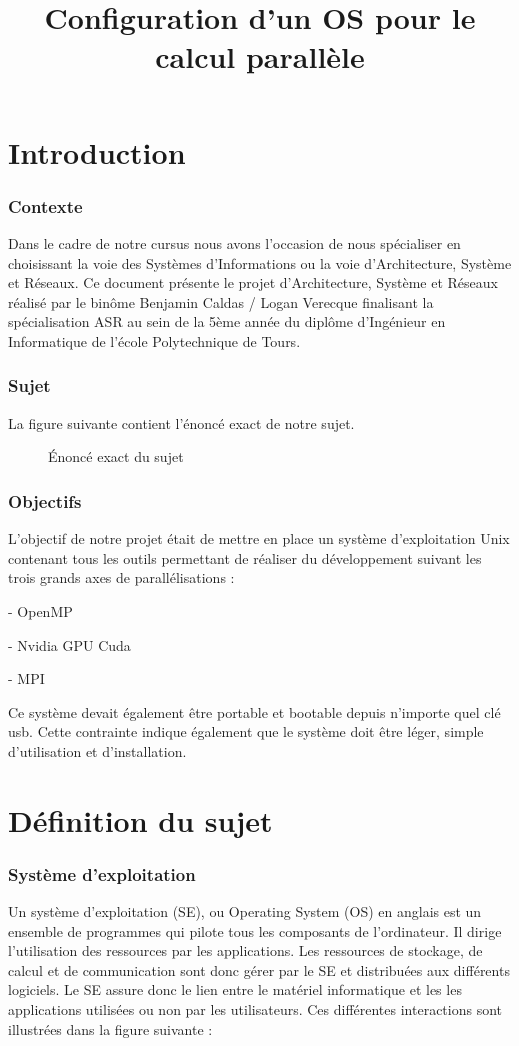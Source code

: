 \documentclass[final]{polytech/polytech}
\title{Configuration d’un OS pour le calcul parallèle}
\begin{document}
\part{Introduction}

\section{Contexte}
Dans le cadre de notre cursus nous avons l’occasion de nous spécialiser en choisissant la voie des Systèmes d’Informations ou la voie d’Architecture, Système et Réseaux. Ce document présente le projet d’Architecture, Système et Réseaux réalisé par le binôme Benjamin Caldas / Logan Verecque finalisant la spécialisation ASR au sein de la 5ème année du diplôme d’Ingénieur en Informatique de l’école Polytechnique de Tours.

\section{Sujet}
La figure suivante contient l'énoncé exact de notre sujet.

\begin{figure}
	\caption{Énoncé exact du sujet}
	\label{fig:enonce_sujet_projet_asr}
\end{figure}

\section{Objectifs}
L’objectif de notre projet était de mettre en place un système d’exploitation Unix contenant tous les outils permettant de réaliser du développement suivant les trois grands axes de parallélisations :

- OpenMP

- Nvidia GPU Cuda

- MPI

Ce système devait également être portable et bootable depuis n’importe quel clé usb. Cette contrainte indique également que le système doit être léger, simple d’utilisation et d’installation.

\part{Définition du sujet}

\section{Système d'exploitation}
Un système d'exploitation (SE), ou Operating System (OS) en anglais est un ensemble de programmes qui pilote tous les composants de l'ordinateur. Il dirige l'utilisation des ressources par les applications. Les ressources de stockage, de calcul et de communication sont donc gérer par le SE et distribuées aux différents logiciels. Le SE assure donc le lien entre le matériel informatique et les les applications utilisées ou non par les utilisateurs. Ces différentes interactions sont illustrées dans la figure suivante :
\end{document}
